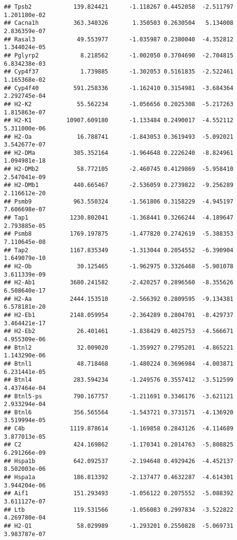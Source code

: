 \documentclass[
]{article}
\begin{document}
\begin{verbatim}
## Tpsb2            139.824421      -1.118267 0.4452058  -2.511797 1.201180e-02
## Cacna1h          363.340326       1.350503 0.2630504   5.134008 2.836359e-07
## Rasal3            49.553977      -1.035987 0.2380040  -4.352812 1.344024e-05
## Pglyrp2            8.218562      -1.002050 0.3704690  -2.704815 6.834238e-03
## Cyp4f37            1.739885      -1.302053 0.5161835  -2.522461 1.165368e-02
## Cyp4f40          591.258336      -1.162410 0.3154981  -3.684364 2.292745e-04
## H2-K2             55.562234      -1.056656 0.2025308  -5.217263 1.815863e-07
## H2-K1          10907.609180      -1.133484 0.2490017  -4.552112 5.311000e-06
## H2-Oa             16.788741      -1.843053 0.3619493  -5.092021 3.542677e-07
## H2-DMa           385.352164      -1.964648 0.2226240  -8.824961 1.094981e-18
## H2-DMb2           58.772105      -2.460745 0.4129869  -5.958410 2.547041e-09
## H2-DMb1          440.665467      -2.536059 0.2739822  -9.256289 2.116612e-20
## Psmb9            963.550324      -1.561806 0.3158229  -4.945197 7.606698e-07
## Tap1            1230.802041      -1.368441 0.3266244  -4.189647 2.793885e-05
## Psmb8           1769.197875      -1.477820 0.2742619  -5.388353 7.110645e-08
## Tap2            1167.835349      -1.313044 0.2054552  -6.390904 1.649079e-10
## H2-Ob             30.125465      -1.962975 0.3326468  -5.901078 3.611339e-09
## H2-Ab1          3680.241582      -2.420257 0.2896560  -8.355626 6.508640e-17
## H2-Aa           2444.153510      -2.566392 0.2809595  -9.134381 6.578181e-20
## H2-Eb1          2148.059954      -2.364289 0.2804701  -8.429737 3.464421e-17
## H2-Eb2            26.401461      -1.838429 0.4025753  -4.566671 4.955309e-06
## Btnl2             32.009020      -1.359927 0.2795201  -4.865221 1.143290e-06
## Btnl1             48.718468      -1.480224 0.3696984  -4.003871 6.231441e-05
## Btnl4            283.594234      -1.249576 0.3557412  -3.512599 4.437464e-04
## Btnl5-ps         790.167757      -1.211691 0.3346176  -3.621121 2.933294e-04
## Btnl6            356.565564      -1.543721 0.3731571  -4.136920 3.519994e-05
## C4b             1119.878614      -1.169858 0.2843126  -4.114689 3.877013e-05
## C2               424.169862      -1.170341 0.2014763  -5.808825 6.291266e-09
## Hspa1b           642.092537      -2.194648 0.4929426  -4.452137 8.502003e-06
## Hspa1a           186.813392      -2.137477 0.4632287  -4.614301 3.944204e-06
## Aif1             151.293493      -1.056122 0.2075552  -5.088392 3.611127e-07
## Ltb              119.531566      -1.056083 0.2997834  -3.522822 4.269780e-04
## H2-Q1             58.029989      -1.293201 0.2550828  -5.069731 3.983787e-07

\end{verbatim}
\end{document}
